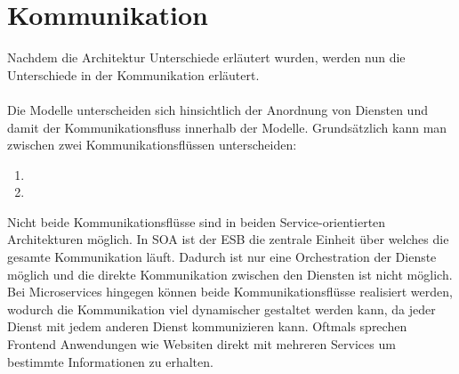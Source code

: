 \section{Kommunikation}
\label{sec:FazitKommunikation}
Nachdem die Architektur Unterschiede erläutert wurden, werden nun die Unterschiede in der Kommunikation erläutert.
\\\\
Die Modelle unterscheiden sich hinsichtlich der Anordnung von Diensten und damit der Kommunikationsfluss innerhalb der Modelle. Grundsätzlich kann man zwischen zwei Kommunikationsflüssen unterscheiden:
\begin{enumerate}
    \item {}
    \item {}
\end{enumerate}
Nicht beide Kommunikationsflüsse sind in beiden Service-orientierten Architekturen möglich. In SOA ist der ESB die zentrale Einheit über welches die gesamte Kommunikation läuft. Dadurch ist nur eine Orchestration der Dienste möglich und die direkte Kommunikation  zwischen den Diensten ist nicht möglich. Bei Microservices hingegen können beide Kommunikationsflüsse realisiert werden, wodurch die Kommunikation viel dynamischer gestaltet werden kann, da jeder Dienst mit jedem anderen Dienst kommunizieren kann. Oftmals sprechen Frontend Anwendungen wie Websiten direkt mit mehreren Services um bestimmte Informationen zu erhalten.

